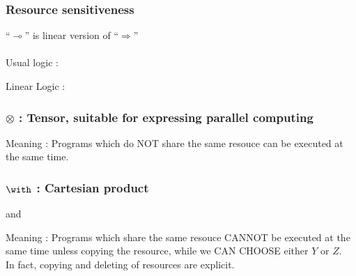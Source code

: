 \documentclass[dvipdfmx,cjk]{beamer}
\theoremstyle{example}
\begin{document}
\begin{frame}
  \frametitle{Resource sensitiveness} 

  ``$\multimap$'' is linear version of ``$\Rightarrow$'' \\~\\

  Usual logic :
  \begin{prooftree}
  \end{prooftree} 

  Linear Logic :
  \begin{prooftree}
  \end{prooftree}

\end{frame}

\begin{frame}
  \frametitle{$\otimes$ : Tensor, suitable for expressing parallel computing} 

  \begin{prooftree}

    
  \end{prooftree} 

  Meaning : Programs which do NOT share the same resouce can be executed
  at the same time.

\end{frame}

\begin{frame}
  \frametitle{$\with$ : Cartesian product} 
  
  \begin{prooftree}

    
  \end{prooftree}

  and

  \begin{prooftree}

    
  \end{prooftree}

  Meaning : Programs which share the same resouce CANNOT be executed
  at the same time unless copying the resource,
  while we CAN CHOOSE either $Y$ or $Z$. \\
  In fact, copying and deleting of resources are explicit.

\end{frame}
\end{document}
